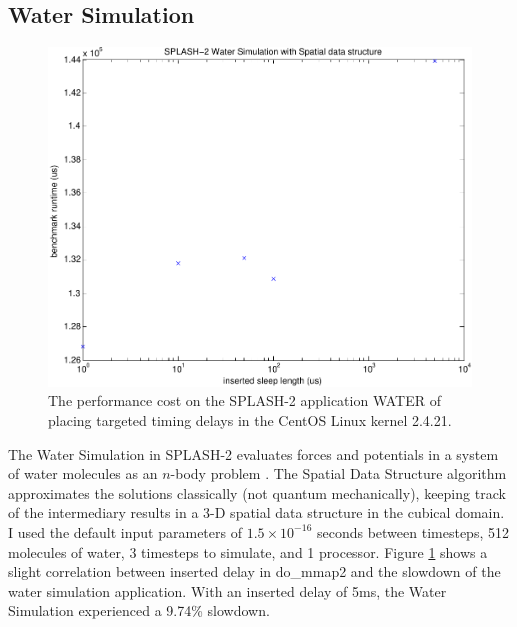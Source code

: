 \documentclass[12pt,conference]{IEEEtran}
\begin{document}
\subsection{Water Simulation}
\begin{figure}
\centering
\includegraphics[width=\columnwidth]{water}
\caption{The performance cost on the SPLASH-2 application WATER of placing targeted timing delays in the CentOS Linux kernel 2.4.21.}
\label{fig_water}
\end{figure}
The Water Simulation in SPLASH-2 evaluates forces and potentials in a system of water molecules as an $n$-body problem \cite{Singh1992}.  The Spatial Data Structure algorithm approximates the solutions classically (not quantum mechanically), keeping track of the intermediary results in a 3-D spatial data structure in the cubical domain.  I used the default input parameters of $1.5 \times 10^{-16}$ seconds between timesteps, 512 molecules of water, 3 timesteps to simulate, and 1 processor.  Figure \ref{fig_water} shows a slight correlation between inserted delay in do\_mmap2 and the slowdown of the water simulation application.  With an inserted delay of 5ms, the Water Simulation experienced a 9.74\% slowdown.
\end{document}
